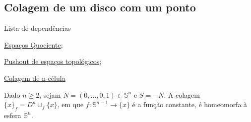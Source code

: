 \subsection{Colagem de um disco com um ponto} %
\label{colagem-de-um-disco-com-um-ponto-ex}
\begin{titlemize}{Lista de dependências}
	\item \hyperref[topologia-quociente-def]{Espaços Quociente};\\
    \item \hyperref[pushout-de-espacos-topologicos-def]{Pushout de espaços topológicos};\\
    \item \hyperref[colagem-de-n-celula-def]{Colagem de n-célula}%
\end{titlemize}

\begin{ex}

    Dado $n\ge 2$, sejam $N = (0,\ldots,0,1) \in \mathbb{S}^n$ e $S = -N$. A colagem $\{x\}_f=D^n\cup_f \{x\}$, em que $f:\mathbb{S}^{n-1}\rightarrow \{x\}$ é a função constante, é homeomorfa à esfera $\mathbb{S}^n$. 
\end{ex}

